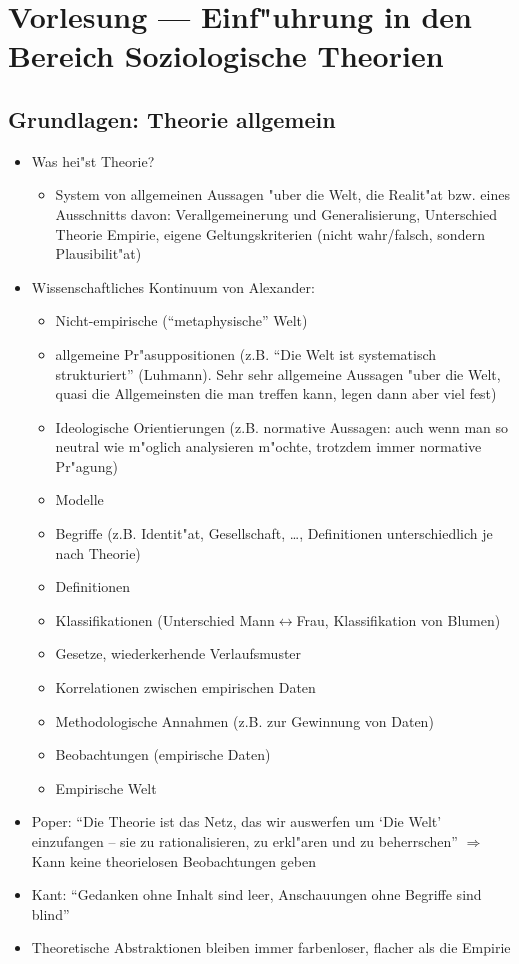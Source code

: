 \section{Vorlesung  --- Einf"uhrung in den Bereich Soziologische Theorien}
\subsection{Grundlagen: Theorie allgemein}
\begin{itemize}
	\item
		Was hei"st Theorie?
		\begin{itemize}
			\item
				System von allgemeinen Aussagen "uber die Welt, die Realit"at bzw. eines Ausschnitts davon: Verallgemeinerung und Generalisierung, Unterschied Theorie Empirie, eigene Geltungskriterien (nicht wahr/falsch, sondern Plausibilit"at)
		\end{itemize}
	\item
		Wissenschaftliches Kontinuum von Alexander:
		\begin{itemize}
			\item
				Nicht-empirische (\enquote{metaphysische} Welt)
			\item
				allgemeine Pr"asuppositionen (z.B. \enquote{Die Welt ist systematisch strukturiert} (Luhmann). Sehr sehr allgemeine Aussagen "uber die Welt, quasi die Allgemeinsten die man treffen kann, legen dann aber viel fest)
			\item
				Ideologische Orientierungen (z.B. normative Aussagen: auch wenn man so neutral wie m"oglich analysieren m"ochte, trotzdem immer normative Pr"agung)
			\item
				Modelle
			\item
				Begriffe (z.B. Identit"at, Gesellschaft, \dots, Definitionen unterschiedlich je nach Theorie)
			\item
				Definitionen
			\item
				Klassifikationen (Unterschied Mann$\leftrightarrow$Frau, Klassifikation von Blumen)
			\item
				Gesetze, wiederkerhende Verlaufsmuster
			\item
				Korrelationen zwischen empirischen Daten
			\item
				Methodologische Annahmen (z.B. zur Gewinnung von Daten)
			\item
				Beobachtungen (empirische Daten)
			\item
				Empirische Welt
		\end{itemize}
	\item
		Poper: \enquote{Die Theorie ist das Netz, das wir auswerfen um \enquote{Die Welt} einzufangen -- sie zu rationalisieren, zu erkl"aren und zu beherrschen} $\Rightarrow$ Kann keine theorielosen Beobachtungen geben
	\item
		Kant: \enquote{Gedanken ohne Inhalt sind leer, Anschauungen ohne Begriffe sind blind}
	\item
		Theoretische Abstraktionen bleiben immer farbenloser, flacher als die Empirie
\end{itemize}

